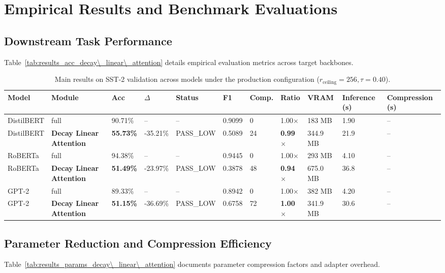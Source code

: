 \section{Empirical Results and Benchmark Evaluations}

\subsection{Downstream Task Performance}
Table~\ref{tab:results_acc_decay\_linear\_attention} details empirical evaluation metrics across target backbones.

\begin{table}[t]
\centering
\small
\begin{tabular}{lllllllllll}
\toprule
\textbf{Model} & \textbf{Module} & \textbf{Acc} & \textbf{$\Delta$} & \textbf{Status} & \textbf{F1} & \textbf{Comp.} & \textbf{Ratio} & \textbf{VRAM} & \textbf{Inference (s)} & \textbf{Compression (s)} \\
\midrule
DistilBERT & full & 90.71\% & -- & -- & 0.9099 & 0 & 1.00$\times$ & 183 MB & 1.90 & -- \\
DistilBERT & \textbf{Decay Linear Attention} & \textbf{55.73\%} & -35.21\% & PASS_LOW & 0.5089 & 24 & \textbf{0.99$\times$} & 344.9 MB & 21.9 & -- \\
RoBERTa & full & 94.38\% & -- & -- & 0.9445 & 0 & 1.00$\times$ & 293 MB & 4.10 & -- \\
RoBERTa & \textbf{Decay Linear Attention} & \textbf{51.49\%} & -23.97\% & PASS_LOW & 0.3878 & 48 & \textbf{0.94$\times$} & 675.0 MB & 36.8 & -- \\
GPT-2 & full & 89.33\% & -- & -- & 0.8942 & 0 & 1.00$\times$ & 382 MB & 4.20 & -- \\
GPT-2 & \textbf{Decay Linear Attention} & \textbf{51.15\%} & -36.69\% & PASS_LOW & 0.6758 & 72 & \textbf{1.00$\times$} & 341.9 MB & 30.6 & -- \\
\bottomrule
\end{tabular}
\caption{Main results on SST-2 validation across models under the production configuration ($r_{\mathrm{ceiling}}=256, \tau=0.40$).}
\label{tab:main_sst2}
\end{table}

\subsection{Parameter Reduction and Compression Efficiency}
Table~\ref{tab:results_params_decay\_linear\_attention} documents parameter compression factors and adapter overhead.

